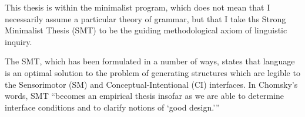 \documentclass[MilwayThesis]{subfiles}
\begin{document}
This thesis is within the minimalist program, which does not mean that I necessarily assume a particular theory of grammar, but that I take ths Strong Minimalist Thesis (SMT) to be the guiding methodological axiom of linguistic inquiry.

The SMT, which has been formulated in a number of ways, states that language is an optimal solution to the problem of generating structures which are legible to the Sensorimotor (SM) and Conceptual-Intentional (CI) interfaces.
In Chomsky's words, SMT ``becomes an empirical thesis insofar as we are able to determine interface conditions and to clarify notions of `good design.''' \parencite[1]{chomsky2001derivation}
\end{document}
